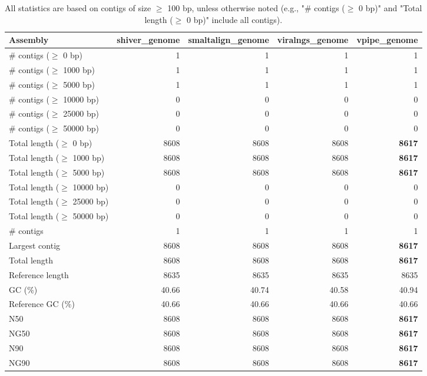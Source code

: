 \documentclass[12pt,a4paper]{article}
\begin{document}
\begin{table}[ht]
\begin{center}
\caption{All statistics are based on contigs of size $\geq$ 100 bp, unless otherwise noted (e.g., "\# contigs ($\geq$ 0 bp)" and "Total length ($\geq$ 0 bp)" include all contigs).}
\begin{tabular}{|l*{4}{|r}|}
\hline
Assembly & shiver\_genome & smaltalign\_genome & viralngs\_genome & vpipe\_genome \\ \hline
\# contigs ($\geq$ 0 bp) & 1 & 1 & 1 & 1 \\ \hline
\# contigs ($\geq$ 1000 bp) & 1 & 1 & 1 & 1 \\ \hline
\# contigs ($\geq$ 5000 bp) & 1 & 1 & 1 & 1 \\ \hline
\# contigs ($\geq$ 10000 bp) & 0 & 0 & 0 & 0 \\ \hline
\# contigs ($\geq$ 25000 bp) & 0 & 0 & 0 & 0 \\ \hline
\# contigs ($\geq$ 50000 bp) & 0 & 0 & 0 & 0 \\ \hline
Total length ($\geq$ 0 bp) & 8608 & 8608 & 8608 & {\bf 8617} \\ \hline
Total length ($\geq$ 1000 bp) & 8608 & 8608 & 8608 & {\bf 8617} \\ \hline
Total length ($\geq$ 5000 bp) & 8608 & 8608 & 8608 & {\bf 8617} \\ \hline
Total length ($\geq$ 10000 bp) & 0 & 0 & 0 & 0 \\ \hline
Total length ($\geq$ 25000 bp) & 0 & 0 & 0 & 0 \\ \hline
Total length ($\geq$ 50000 bp) & 0 & 0 & 0 & 0 \\ \hline
\# contigs & 1 & 1 & 1 & 1 \\ \hline
Largest contig & 8608 & 8608 & 8608 & {\bf 8617} \\ \hline
Total length & 8608 & 8608 & 8608 & {\bf 8617} \\ \hline
Reference length & 8635 & 8635 & 8635 & 8635 \\ \hline
GC (\%) & 40.66 & 40.74 & 40.58 & 40.94 \\ \hline
Reference GC (\%) & 40.66 & 40.66 & 40.66 & 40.66 \\ \hline
N50 & 8608 & 8608 & 8608 & {\bf 8617} \\ \hline
NG50 & 8608 & 8608 & 8608 & {\bf 8617} \\ \hline
N90 & 8608 & 8608 & 8608 & {\bf 8617} \\ \hline
NG90 & 8608 & 8608 & 8608 & {\bf 8617} \\ \hline

\end{tabular}
\end{center}
\end{table}
\end{document}
